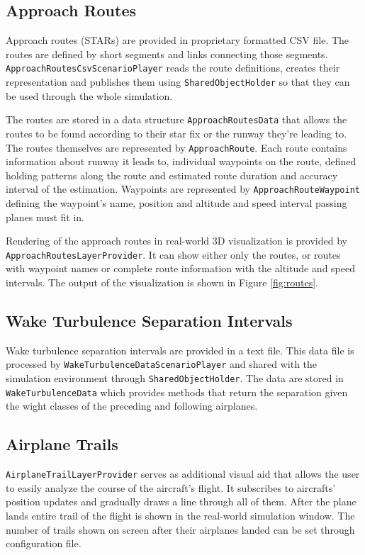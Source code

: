 \subsection{Approach Routes}

Approach routes (STARs) are provided in proprietary formatted CSV file. The routes are defined by short segments and links connecting those segments. \texttt{ApproachRoutes\-Csv\-ScenarioPlayer} reads the route definitions, creates their representation and publishes them using \texttt{SharedObjectHolder} so that they can be used through the whole simulation.

The routes are stored in a data structure \texttt{ApproachRoutesData} that allows the routes to be found according to their star fix or the runway they're leading to. The routes themselves are represented by \texttt{ApproachRoute}. Each route contains information about runway it leads to, individual waypoints on the route, defined holding patterns along the route and estimated route duration and accuracy interval of the estimation. Waypoints are represented by \texttt{ApproachRouteWaypoint} defining the waypoint's name, position and altitude and speed interval passing planes must fit in.

Rendering of the approach routes in real-world 3D visualization is provided by \texttt{Approach\-Routes\-LayerProvider}. It can show either only the routes, or routes with waypoint names or complete route information with the altitude and speed intervals. The output of the visualization is shown in Figure \ref{fig:routes}.

\subsection{Wake Turbulence Separation Intervals}

Wake turbulence separation intervals are provided in a text file. This data file is processed by \texttt{WakeTurbulenceDataScenarioPlayer} and shared with the simulation environment through \texttt{SharedObjectHolder}. The data are stored in \texttt{WakeTurbulenceData} which provides methods that return the separation given the wight classes of the preceding and following airplanes.

\subsection{Airplane Trails}

\texttt{AirplaneTrailLayerProvider} serves as additional visual aid that allows the user to easily analyze the course of the aircraft's flight. It subscribes to aircrafts' position updates and gradually draws a line through all of them. After the plane lands entire trail of the flight is shown in the real-world simulation window. The number of trails shown on screen after their airplanes landed can be set through configuration file.

